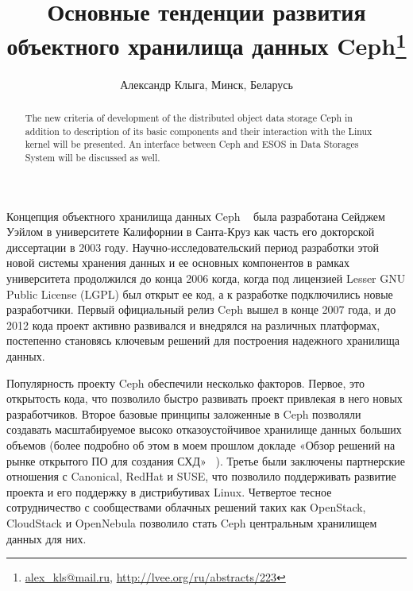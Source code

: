 \documentclass[10pt, a5paper]{article}
\begin{document}
\title{Основные тенденции развития объектного хранилища данных Ceph\footnote{\url{alex_kls@mail.ru}, \url{http://lvee.org/ru/abstracts/223}}}
\author{Александр Клыга, Минск, Беларусь}
\maketitle
\begin{abstract}
The new criteria of development of the distributed object data storage Ceph in addition to description of its basic components and their interaction with the Linux kernel will be presented. An interface between Ceph and ESOS in Data Storages System will be discussed as well.
\end{abstract}
Концепция объектного хранилища данных Ceph ~\cite{Kliga1} была разработана Сейджем Уэйлом в университете Калифорнии в Санта-Круз как часть его докторской диссертации в 2003 году. \linebreak Научно-исследовательский период разработки этой новой системы хранения данных и ее основных компонентов в рамках университета продолжился до конца 2006 когда, когда  под лицензией Lesser GNU Public License (LGPL) был открыт ее код, а к разработке подключились новые разработчики. Первый официальный релиз Ceph вышел в конце 2007 года, и до 2012 кода проект активно развивался и внедрялся на различных платформах, постепенно становясь ключевым решений для построения надежного хранилища данных.

Популярность проекту Ceph обеспечили несколько факторов. Первое, это открытость кода, что позволило быстро развивать проект привлекая в него новых разработчиков. Второе базовые принципы заложенные в Ceph позволяли создавать масштабируемое высоко отказоустойчивое  хранилище данных больших объемов (более подробно об этом в моем прошлом докладе «Обзор решений на рынке открытого ПО для создания СХД» ~\cite{Kliga2}). Третье были заключены  партнерские отношения с Canonical, RedHat и SUSE, что позволило поддерживать развитие проекта и его поддержку в дистрибутивах Linux. Четвертое тесное сотрудничество с сообществами облачных решений таких как OpenStack, CloudStack и OpenNebula позволило стать Ceph центральным хранилищем данных для них.
\end{document}
